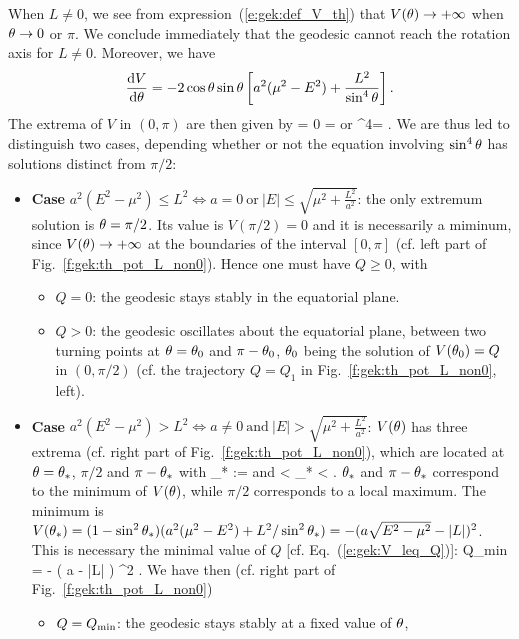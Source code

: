 When $L\not=0$, we see from expression~(\ref{e:gek:def_V_th}) that
$V(\theta) \to +\infty$ when $\theta\to 0$ or $\pi$.
We conclude immediately that the geodesic cannot reach the rotation axis
for $L\not=0$.
Moreover, we have
\[
    \frac{\mathrm{d} V}{\mathrm{d} \theta} = - 2 \cos\theta\sin\theta \left[ a^2 (\mu^2 - E^2) + \frac{L^2}{\sin^4\theta} \right] .
\]
The extrema of $V$ in $(0,\pi)$ are then given by
\be
     = 0 \iff
        \th =  \quad\mbox{or}\quad
        \sin^4\th =  .
\ee
We are thus led to distinguish two cases, depending whether or not the
equation involving $\sin^4\theta$ has solutions distinct from $\pi/2$:
\begin{itemize}
\item \textbf{Case} $a^2(E^2 - \mu^2) \leq L^2 \iff a=0\
\mbox{or}\ |E| \leq \sqrt{\mu^2 + \frac{L^2}{a^2}}$: the only extremum solution is
$\theta=\pi/2$.
Its value is $V(\pi/2)=0$ and it is
necessarily a miminum, since $V(\theta) \to +\infty$ at the boundaries of the
interval $[0,\pi]$ (cf. left part of Fig.~\ref{f:gek:th_pot_L_non0}).
Hence one must have $Q\geq 0$, with
\begin{itemize}
\item $Q=0$: the geodesic stays stably in the
equatorial plane.
\item $Q>0$: the geodesic oscillates about the equatorial plane,
between two turning points at $\theta=\theta_0$ and $\pi-\theta_0$, $\theta_0$ being the solution
of $V(\theta_0) = Q$ in $(0,\pi/2)$ (cf. the trajectory $Q=Q_1$ in Fig.~\ref{f:gek:th_pot_L_non0}, left).
\end{itemize}
\item \textbf{Case} $a^2(E^2 - \mu^2) > L^2 \iff a\neq 0\
\mbox{and}\ |E| > \sqrt{\mu^2 + \frac{L^2}{a^2}}$: $V(\theta)$ has three extrema (cf. right part of Fig.~\ref{f:gek:th_pot_L_non0}), which are located at
$\theta=\theta_*$, $\pi/2$ and $\pi-\theta_*$ with
\be
    \th_* := \arcsin{}
    \quad\mbox{and} < \th_* <  .
\ee
$\theta_*$ and $\pi-\theta_*$ correspond to the minimum of $V(\theta)$,
while $\pi/2$ corresponds to a local maximum. The minimum is
$V(\th_*) = (1-\sin^2\th_*)(a^2(\mu^2-E^2) + L^2/\sin^2\th_*) = - (a  - |L|)^2$.
This is necessary the minimal value of $Q$ [cf. Eq.~(\ref{e:gek:V_leq_Q})]:
\be
    Q_{\rm min} = - \left( a \sqrt{E^2 - \mu^2} - |L| \right) ^2 .
\ee
We have then (cf. right part of Fig.~\ref{f:gek:th_pot_L_non0})
\begin{itemize}
\item $Q = Q_{\rm min}$: the geodesic stays stably at a fixed value of $\theta$,

\end{itemize}
\end{itemize}
